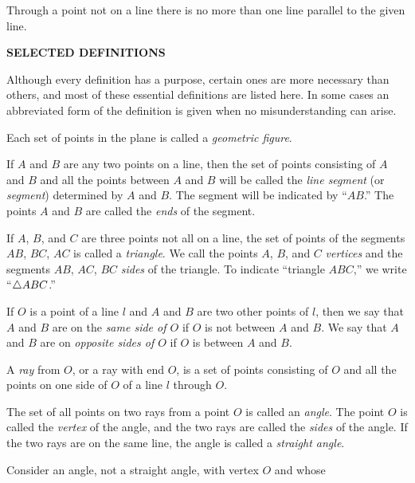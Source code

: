 \documentclass[11pt]{book}
\newcommand{\APPhead}[2]{%
  \par\bigskip\begin{center}\bfseries #1\end{center}%
  \addcontentsline{toc}{section}{#2}\par\nopagebreak\medskip}
\begin{document}
\begin{applist}[resume]
\item Through a point not on a line there is no more than one line parallel
      to the given line.
\end{applist}

\APPhead{SELECTED DEFINITIONS}{Selected Definitions}

Although every definition has a purpose, certain ones are more necessary
than others, and most of these essential definitions are listed here. In
some cases an abbreviated form of the definition is given when no
misunderstanding can arise.

\begin{applist}
\item Each set of points in the plane is called a \emph{geometric figure}.
\item If $A$ and $B$ are any two points on a line, then the set of points
      consisting of $A$ and $B$ and all the points between $A$ and $B$ will
      be called the \emph{line segment} (or \emph{segment}) determined by
      $A$ and $B$. The segment will be indicated by ``$AB$.'' The points
      $A$ and $B$ are called the \emph{ends} of the segment.
\item If $A$, $B$, and $C$ are three points not all on a line, the set of
      points of the segments $AB$, $BC$, $AC$ is called a \emph{triangle}.
      We call the points $A$, $B$, and $C$ \emph{vertices} and the segments
      $AB$, $AC$, $BC$ \emph{sides} of the triangle. To indicate ``triangle
      $ABC$,'' we write ``$\triangle ABC$.''
\item If $O$ is a point of a line $l$ and $A$ and $B$ are two other points
      of $l$, then we say that $A$ and $B$ are on the \emph{same side of
      $O$} if $O$ is not between $A$ and $B$. We say that $A$ and $B$ are on
      \emph{opposite sides of $O$} if $O$ is between $A$ and $B$.
\item A \emph{ray} from $O$, or a ray with end $O$, is a set of
      points consisting of $O$ and all the points on one side of $O$ of a
      line $l$ through $O$.
\item The set of all points on two rays from a point $O$ is called an
      \emph{angle}. The point $O$ is called the \emph{vertex} of the angle,
      and the two rays are called the \emph{sides} of the angle. If the two
      rays are on the same line, the angle is called a \emph{straight
      angle}.
\item Consider an angle, not a straight angle, with vertex $O$ and whose

\end{applist}
\end{document}
